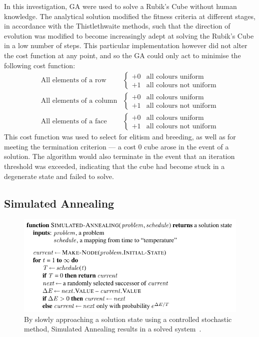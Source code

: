 \documentclass[UKenglish]{svproc}
\begin{document}
In this investigation, GA were used to solve a Rubik's Cube without human knowledge. The analytical solution modified the fitness criteria at different stages, in accordance with the Thistlethwaite methods, such that the direction of evolution was modified to become increasingly adept at solving the Rubik's Cube in a low number of steps. This particular implementation however did not alter the cost function at any point, and so the GA could only act to minimise the following cost function:
\begin{align*}
  \text{All elements of a row} &
  \begin{cases}
    +0 & \text{all colours uniform} \\
    +1 & \text{all colours not uniform}
  \end{cases} \\
  \text{All elements of a column} &
  \begin{cases}
    +0 & \text{all colours uniform} \\
    +1 & \text{all colours not uniform}
  \end{cases} \\
  \text{All elements of a face} &
  \begin{cases}
    +0 & \text{all colours uniform} \\
    +1 & \text{all colours not uniform}
  \end{cases}
\end{align*}
This cost function was used to select for elitism and breeding, as well as for meeting the termination criterion --- a cost 0 cube arose in the event of a solution. The algorithm would also terminate in the event that an iteration threshold was exceeded, indicating that the cube had become stuck in a degenerate state and failed to solve.

\subsection{Simulated Annealing}

\begin{figure}[!ht]
  \centering
  \includegraphics[width=0.8\linewidth]{simulated-annealing}
  \caption{By slowly approaching a solution state using a controlled stochastic
    method, Simulated Annealing results in a solved system~\cite{10.5555/1671238}.}
  \label{fig:simulated-annealing}
\end{figure}
\end{document}
